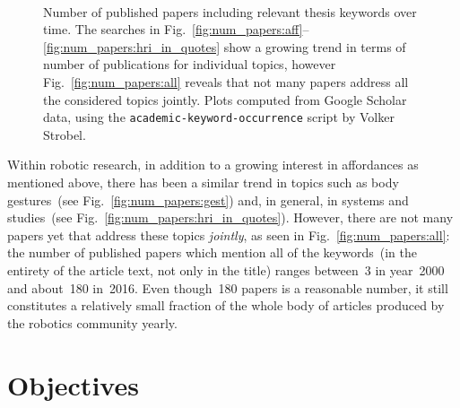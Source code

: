 \begin{figure}[t!] %
\centering
{} \quad
%
 \\
%
 \quad
%
\cprotect\caption[Number of published papers including relevant thesis keywords over time.]{Number of published papers including relevant thesis keywords over time. The searches in Fig.~\ref{fig:num_papers:aff}--\ref{fig:num_papers:hri_in_quotes} show a growing trend in terms of number of publications for individual topics, however Fig.~\ref{fig:num_papers:all} reveals that not many papers address all the considered topics jointly.
Plots computed from Google Scholar data, using the \verb!academic-keyword-occurrence! script by Volker Strobel\protect\footnotemark.}
\label{fig:num_papers}
\end{figure}

Within robotic research, in addition to a growing interest in affordances as mentioned above, there has been a similar trend in topics such as body gestures~(see Fig.~\ref{fig:num_papers:gest}) and, in general, in \hri{} systems and studies~(see Fig.~\ref{fig:num_papers:hri_in_quotes}).
However, there are not many papers yet that address these topics \emph{jointly}, as seen in Fig.~\ref{fig:num_papers:all}: the number of published papers which mention all of the keywords~(in the entirety of the article text, not only in the title) ranges between~3 in year~2000 and about~180 in~2016.
Even though~180 papers is a reasonable number, it still constitutes a relatively small fraction of the whole body of articles produced by the robotics community yearly.

\section{Objectives}

